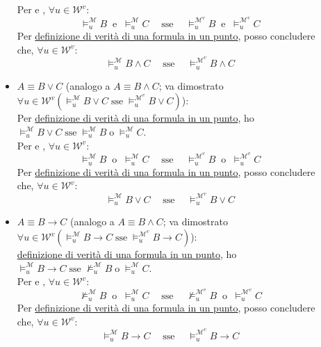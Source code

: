 \documentclass[a4paper,12pt]{article}
\newcommand{\latinmodern}[1]{\text{#1}}
\newcommand{\latinmath}[1]{\text{\latinmodern{#1}}} %
\begin{document}
\begin{dimo}
\begin{description}
\begin{itemize}
			            Per \latinmath{IH1} e \latinmath{IH2}, $\forall u \in \mathcal{W}^{v}$:
			            $$\vDash_u^{\mathcal{M}} B \;\; \text{e} \;\; \vDash_u^{\mathcal{M}} C \quad \; \text{sse} \quad \; \vDash_u^{\mathcal{M}^{v}} B \;\; \text{e} \;\; \vDash_u^{\mathcal{M}^{v}} C$$
			            Per \hyperlink{defverp}{definizione di verità di una formula in un punto}, posso concludere che, $\forall u \in \mathcal{W}^{v}$:
			            $$\vDash_u^{\mathcal{M}} B \land C \quad \; \text{sse} \quad \; \vDash_u^{\mathcal{M}^{v}} B \land C$$
			      \item $A \equiv B \lor C$ (analogo a $A \equiv B \land C$; va dimostrato \emph{$\forall u \in \mathcal{W}^{v} (\vDash_u^{\mathcal{M}} B \lor C \; \text{sse} \; \vDash_u^{\mathcal{M}^{v}} B \lor C)$}):\\
			            Per \hyperlink{defverp}{definizione di verità di una formula in un punto}, ho $\vDash_u^{\mathcal{M}} B \lor C \; \text{sse} \; \vDash_u^{\mathcal{M}} B \; \text{o} \; \vDash_u^{\mathcal{M}} C$. \\
			            Per \latinmath{IH1} e \latinmath{IH2}, $\forall u \in \mathcal{W}^{v}$:
			            $$\vDash_u^{\mathcal{M}} B \;\; \text{o} \;\; \vDash_u^{\mathcal{M}} C \quad \; \text{sse} \quad \; \vDash_u^{\mathcal{M}^{v}} B \;\; \text{o} \;\; \vDash_u^{\mathcal{M}^{v}} C$$
			            Per \hyperlink{defverp}{definizione di verità di una formula in un punto}, posso concludere che, $\forall u \in \mathcal{W}^{v}$:
			            $$\vDash_u^{\mathcal{M}} B \lor C \quad \; \text{sse} \quad \; \vDash_u^{\mathcal{M}^{v}} B \lor C$$
			      \item $A \equiv B \to C$ (analogo a $A \equiv B \land C$; va dimostrato \emph{$\forall u \in \mathcal{W}^{v} (\vDash_u^{\mathcal{M}} B \to C \; \text{sse} \; \vDash_u^{\mathcal{M}^{v}} B \to C)$}):\\
			            \hyperlink{defverp}{definizione di verità di una formula in un punto}, ho $\vDash_u^{\mathcal{M}} B \to C \; \text{sse} \; \nvDash_u^{\mathcal{M}} B \; \text{o} \; \vDash_u^{\mathcal{M}} C$. \\
			            Per \latinmath{IH1} e \latinmath{IH2}, $\forall u \in \mathcal{W}^{v}$:
			            $$\nvDash_u^{\mathcal{M}} B \;\; \text{o} \;\; \vDash_u^{\mathcal{M}} C \quad \; \text{sse} \quad \; \nvDash_u^{\mathcal{M}^{v}} B \;\; \text{o} \;\; \vDash_u^{\mathcal{M}^{v}} C$$
			            Per \hyperlink{defverp}{definizione di verità di una formula in un punto}, posso concludere che, $\forall u \in \mathcal{W}^{v}$:
			            $$\vDash_u^{\mathcal{M}} B \to C \quad \; \text{sse} \quad \; \vDash_u^{\mathcal{M}^{v}} B \to C$$

\end{itemize}
\end{description}
\end{dimo}
\end{document}
